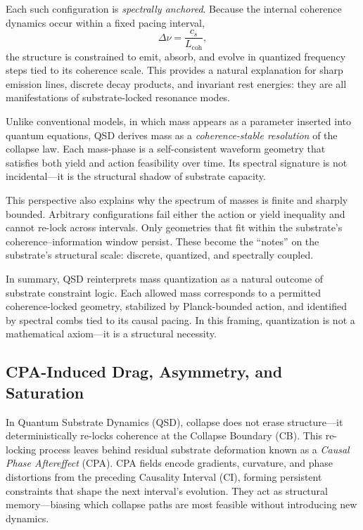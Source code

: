 \documentclass[preprints,article,submit,pdftex,moreauthors]{Definitions/mdpi}
\begin{document}
Each such configuration is \emph{spectrally anchored}. Because the internal coherence dynamics occur within a fixed pacing interval,
\[
\Delta \nu = \frac{c_s}{L_{\mathrm{coh}}},
\]
the structure is constrained to emit, absorb, and evolve in quantized frequency steps tied to its coherence scale. This provides a natural explanation for sharp emission lines, discrete decay products, and invariant rest energies: they are all manifestations of substrate-locked resonance modes.

Unlike conventional models, in which mass appears as a parameter inserted into quantum equations, QSD derives mass as a \emph{coherence-stable resolution} of the collapse law. Each mass-phase is a self-consistent waveform geometry that satisfies both yield and action feasibility over time. Its spectral signature is not incidental—it is the structural shadow of substrate capacity.

This perspective also explains why the spectrum of masses is finite and sharply bounded. Arbitrary configurations fail either the action or yield inequality and cannot re-lock across intervals. Only geometries that fit within the substrate’s coherence–information window persist. These become the “notes” on the substrate’s structural scale: discrete, quantized, and spectrally coupled.

In summary, QSD reinterprets mass quantization as a natural outcome of substrate constraint logic. Each allowed mass corresponds to a permitted coherence-locked geometry, stabilized by Planck-bounded action, and identified by spectral combs tied to its causal pacing. In this framing, quantization is not a mathematical axiom—it is a structural necessity.

\subsection{CPA-Induced Drag, Asymmetry, and Saturation}

In Quantum Substrate Dynamics (QSD), collapse does not erase structure—it deterministically re-locks coherence at the Collapse Boundary (CB). This re-locking process leaves behind residual substrate deformation known as a \emph{Causal Phase Aftereffect} (CPA). CPA fields encode gradients, curvature, and phase distortions from the preceding Causality Interval (CI), forming persistent constraints that shape the next interval’s evolution. They act as structural memory—biasing which collapse paths are most feasible without introducing new dynamics.
\end{document}
